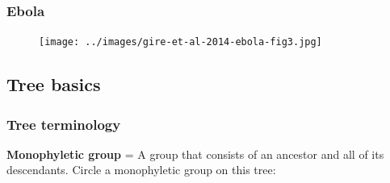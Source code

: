 
\begin{frame}
    \frametitle{Ebola}
    \begin{figure}
        \begin{center}
        \texttt{[image: ../images/gire-et-al-2014-ebola-fig3.jpg]}
        \caption{\tiny {}}
        \end{center}
    \end{figure}
\end{frame}




\subsection{Tree basics}


\begin{frame}
    \frametitle{Tree terminology}

        

\end{frame}



\begin{noheadline}
\begin{frame}
    \begin{adjustwidth}{-1.5em}{-1.5em}
    \textbf{Monophyletic group} =  A group that consists of an ancestor and all
    of its descendants. Circle a monophyletic group on this tree:

    \begin{center}
        
    \end{center}

    \end{adjustwidth}
\end{frame}
\end{noheadline}



